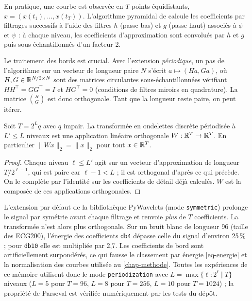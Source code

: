 En pratique, une courbe est observée en $T$ points équidistants, $x=(x(t_1),\dots,x(t_T))$. L'algorithme pyramidal de \citet{mallat1989theory} calcule les coefficients par filtrages successifs à l'aide des filtres $h$ (passe-bas) et $g$ (passe-haut) associés à $\phi$ et $\psi$ : à chaque niveau, les coefficients d'approximation sont convolués par $h$ et $g$ puis sous-échantillonnés d'un facteur 2.

Le traitement des bords est crucial. Avec l'extension \emph{périodique}, un pas de l'algorithme sur un vecteur de longueur paire $N$ s'écrit $a\mapsto(Ha,Ga)$, où $H,G\in\mathbb{R}^{N/2\times N}$ sont des matrices circulantes sous-échantillonnées vérifiant $HH^\top=GG^\top=I$ et $HG^\top=0$ (conditions de filtres miroirs en quadrature). La matrice $\binom{H}{G}$ est donc orthogonale. Tant que la longueur reste paire, on peut itérer.

\begin{proposition}\label{prop-dwt-orthogonale}
Soit $T=2^{L}q$ avec $q$ impair. La transformée en ondelettes discrète périodisée à $L'\le L$ niveaux est une application linéaire orthogonale $W:\mathbb{R}^T\to\mathbb{R}^T$. En particulier $\|Wx\|_2=\|x\|_2$ pour tout $x\in\mathbb{R}^T$.
\end{proposition}

\begin{proof}
Chaque niveau $\ell\le L'$ agit sur un vecteur d'approximation de longueur $T/2^{\ell-1}$, qui est paire car $\ell-1<L$ ; il est orthogonal d'après ce qui précède. On le complète par l'identité sur les coefficients de détail déjà calculés. $W$ est la composée de ces applications orthogonales.
\end{proof}

\begin{remarque}\label{rem-mode-symmetric}
L'extension par défaut de la bibliothèque PyWavelets (mode \texttt{symmetric}) prolonge le signal par symétrie avant chaque filtrage et renvoie \emph{plus} de $T$ coefficients. La transformée n'est alors plus orthogonale. Sur un bruit blanc de longueur 96 (taille des ECG200), l'énergie des coefficients \texttt{db4} dépasse celle du signal d'environ 25\,\% ; pour \texttt{db10} elle est multipliée par 2,7. Les coefficients de bord sont artificiellement surpondérés, ce qui fausse le classement par énergie \eqref{eq-energie} et la normalisation des courbes utilisée au \cref{chap-methode}. Toutes les expériences de ce mémoire utilisent donc le mode \texttt{periodization} avec $L=\max\{\ell:2^\ell\mid T\}$ niveaux ($L=5$ pour $T=96$, $L=8$ pour $T=256$, $L=10$ pour $T=1024$) ; la propriété de Parseval est vérifiée numériquement par les tests du dépôt.
\end{remarque}

